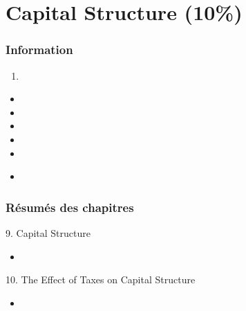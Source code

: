 \chapter[Capital Structure]{Capital Structure (10\%)}

\subsection{Information}

\begin{distributions}[Objective]

\end{distributions}

\begin{outcomes}
\begin{enumerate}
	\item	
\end{enumerate}
\end{outcomes}

\begin{ASM_chapter}
\begin{itemize}
	\item	{}
	\item	{}
	\item	{}
	\item	{}
	\item	{}
\end{itemize}
\end{ASM_chapter}

\begin{YTB_vids}
\begin{itemize}
	\item	
\end{itemize}
\end{YTB_vids}

\subsection{Résumés des chapitres}

\begin{CHPT_SUMM_AUTO}[label = {L.-9}]{9. Capital Structure}
	\begin{itemize}
		\item	
	\end{itemize}
\end{CHPT_SUMM_AUTO}

\begin{CHPT_SUMM_AUTO}[label = {L.-10}]{10. The Effect of Taxes on Capital Structure}
	\begin{itemize}
		\item	
	\end{itemize}
\end{CHPT_SUMM_AUTO}

